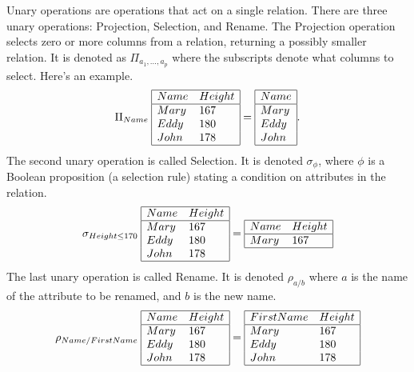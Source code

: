 Unary operations are operations that act on a single relation. There are three
unary operations: Projection, Selection, and Rename.  The Projection operation
selects zero or more columns from a relation, returning a possibly smaller relation.
It is denoted as $\Pi_{a_1,\ldots,a_p}$ where the subscripts denote what
columns to select. Here's an example.
$$
\Pi_{Name}\;
\begin{array}{|ll|}
\hline
Name & Height\\
\hline
Mary & 167\\
Eddy & 180\\
John & 178\\
\hline
\end{array}
= 
\begin{array}{|l|}
\hline
Name \\
\hline
Mary \\
Eddy \\
John \\
\hline
\end{array}.
$$
The second unary operation is called Selection. It is denoted $\sigma_\phi$, where
$\phi$ is a Boolean proposition (a selection rule) stating a condition on attributes
in the relation.
$$
\sigma_{Height\leq 170}\;
\begin{array}{|ll|}
\hline
Name & Height\\
\hline
Mary & 167\\
Eddy & 180\\
John & 178\\
\hline
\end{array}
=
\begin{array}{|ll|}
\hline
Name & Height\\
\hline
Mary & 167\\
\hline
\end{array}
$$
The last unary operation is called Rename. It is denoted ${\rho_{a/b}}$ where
$a$ is the name of the attribute to be renamed, and $b$ is the new name.
$$
\rho_{Name/FirstName}\;
\begin{array}{|ll|}
\hline
Name & Height\\
\hline
Mary & 167\\
Eddy & 180\\
John & 178\\
\hline
\end{array}
=
\begin{array}{|ll|}
\hline
FirstName & Height\\
\hline
Mary & 167\\
Eddy & 180\\
John & 178\\
\hline
\end{array}
$$

